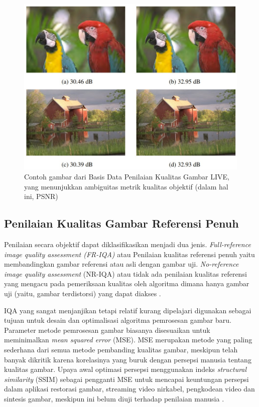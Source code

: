 \begin{figure}[H]
	\vspace{-0.1cm}
	\begin{center}
		\includegraphics[width=0.9\columnwidth]{bab2/Gambar/Contoh gambar dari Basis Data.jpg} 
	\end{center}
	\vspace{-0.2cm}
	\caption{Contoh gambar dari Basis Data Penilaian Kualitas Gambar LIVE, yang menunjukkan ambiguitas metrik kualitas objektif (dalam hal ini, PSNR)\citep{Sheikh2006}}\label{Contoh gambar dari Basis Data}
\end{figure}

\subsection{Penilaian Kualitas Gambar Referensi Penuh}
\hspace{1,2cm}Penilaian secara objektif dapat diklasifikasikan menjadi dua jenis.  \textit{Full-reference image quality assessment (FR-IQA)} atau Penilaian kualitas referensi penuh yaitu membandingkan gambar referensi atau asli dengan gambar uji. \textit{No-reference image quality assessment} (NR-IQA) atau tidak ada penilaian kualitas referensi yang mengacu pada pemeriksaan kualitas oleh algoritma dimana hanya gambar uji (yaitu, gambar terdistorsi) yang dapat diakses \citep{Varga2021,Dihin2020}.

IQA yang sangat menjanjikan tetapi relatif kurang dipelajari digunakan sebagai tujuan untuk desain dan optimalisasi algoritma pemrosesan gambar baru. Parameter metode pemrosesan gambar biasanya disesuaikan untuk meminimalkan \textit{mean squared error} (MSE). MSE merupakan metode yang paling sederhana dari semua metode pembanding kualitas gambar, meskipun telah banyak dikritik karena korelasinya yang buruk dengan persepsi manusia tentang kualitas gambar. Upaya awal optimasi persepsi menggunakan indeks \textit{structural similarity} (SSIM) sebagai pengganti MSE untuk mencapai keuntungan persepsi dalam aplikasi restorasi gambar, streaming video nirkabel, pengkodean video dan sintesis gambar, meskipun ini belum diuji terhadap penilaian manusia \citep{Ding2021}.

